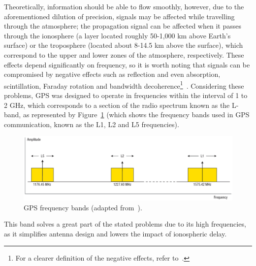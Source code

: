 Theoretically, information should be able to flow smoothly, however, due to the aforementioned dilution of precision, signals may be affected while travelling through the atmosphere;
the propagation signal can be affected when it passes through the ionosphere (a layer located roughly 50-1,000 km above Earth's surface) or the troposphere (located about 8-14.5 km above the surface), which correspond to the upper and lower zones of the atmosphere, respectively. These effects depend significantly on frequency, so it is worth noting that signals can be compromised by negative effects such as reflection and even absorption, scintillation, Faraday rotation and bandwidth decoherence\footnote{For a clearer definition of the negative effects, refer to~\cite{ieee_terms_1997}.}~\cite{au_gov_satell}. Considering these problems, GPS was designed to operate in frequencies within the interval of 1 to 2 GHz, which corresponds to a section of the radio spectrum known as the L-band, as represented by Figure~\ref{fig:gps_bands} (which shows the frequency bands used in GPS communication, known as the L1, L2 and L5 frequencies).
\begin{figure}[ht]
	\centering
	\includegraphics[width=1.0\textwidth]{Chapters/Figures/gps_bands.png}
	\caption{GPS frequency bands (adapted from~\cite{novatel_gnss}).}
	\label{fig:gps_bands}
\end{figure}

This band solves a great part of the stated problems due to its high frequencies, as it simplifies antenna design and lowers the impact of ionospheric delay.


